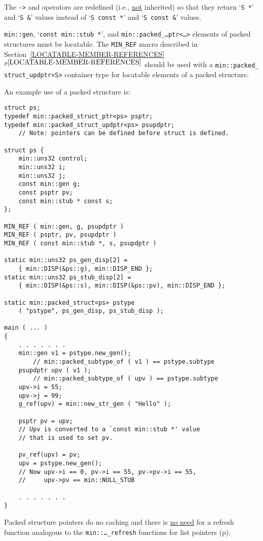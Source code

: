 \documentclass[12pt]{article}
\newcommand{\itemref}[1]{\ref{#1}$^{p\pageref{#1}}$}
\newcommand{\pagref}[1]{p\pageref{#1}}
\newcommand{\EOL}{\penalty \exhyphenpenalty}
\newcommand{\BRACKETED}[1]{{\tt <#1>}}
\newcommand{\SARG}{\BRACKETED{S}}
\newenvironment{indpar}[1][0.3in]%
	{\begin{list}{}%
		     {\setlength{\itemsep}{0in}%
		      \setlength{\topsep}{0in}%
		      \setlength{\parsep}{1ex}%
		      \setlength{\labelwidth}{#1}%
		      \setlength{\leftmargin}{#1}%
		      \addtolength{\leftmargin}{\labelsep}}%
	 \item}%
	{\end{list}}
\begin{document}
The {\tt ->} and {\tt *} operators are redefined (i.e., \underline{not}
inherited) so that they
return `{\tt S~*}' and `{\tt S~\&}' values instead of
`{\tt S~const~*}' and `{\tt S~const~\&}' values.

{\tt min::gen}, `{\tt const min::stub~*}', and
{\tt min::\EOL packed\_\EOL\ldots ptr\BRACKETED{\ldots}}
elements of packed structures must be locatable.
The {\tt MIN\_REF}\label{PACKED_STRUCT_MIN_REF}
macro described in Section~\itemref{LOCATABLE-MEMBER-REFERENCES}
should be used with a {\tt min::\EOL packed\_\EOL
struct\_\EOL updptr\SARG} container type
for locatable elements of a packed structure.

An example use of a packed structure is:
\begin{indpar}\begin{verbatim}
struct ps;
typedef min::packed_struct_ptr<ps> psptr;
typedef min::packed_struct_updptr<ps> psupdptr;
    // Note: pointers can be defined before struct is defined.

struct ps {
    min::uns32 control;
    min::uns32 i;
    min::uns32 j;
    const min::gen g;
    const psptr pv;
    const min::stub * const s;
};

MIN_REF ( min::gen, g, psupdptr )
MIN_REF ( psptr, pv, psupdptr )
MIN_REF ( const min::stub *, s, psupdptr )

static min::uns32 ps_gen_disp[2] =
    { min::DISP(&ps::g), min::DISP_END };
static min::uns32 ps_stub_disp[2] =
    { min::DISP(&ps::s), min::DISP(&ps::pv), min::DISP_END };

static min::packed_struct<ps> pstype
    ( "pstype", ps_gen_disp, ps_stub_disp );

main ( ... )
{
    . . . . . . .
    min::gen v1 = pstype.new_gen();
        // min::packed_subtype_of ( v1 ) == pstype.subtype
    psupdptr upv ( v1 );
        // min::packed_subtype_of ( upv ) == pstype.subtype
    upv->i = 55;
    upv->j = 99;
    g_ref(upv) = min::new_str_gen ( "Hello" );

    psptr pv = upv;
    // Upv is converted to a `const min::stub *' value
    // that is used to set pv.

    pv_ref(upv) = pv;
    upv = pstype.new_gen();
    // Now upv->i == 0, pv->i == 55, pv->pv->i == 55,
    //     upv->pv == min::NULL_STUB

    . . . . . . .
}
\end{verbatim}\end{indpar}

Packed structure pointers do no caching and
there is \underline{no need} for
a refresh function analogous to the {\tt min::\EOL \ldots\_\EOL refresh}
functions for list pointers (\pagref{LIST-POINTER-CACHE}).
\end{document}
